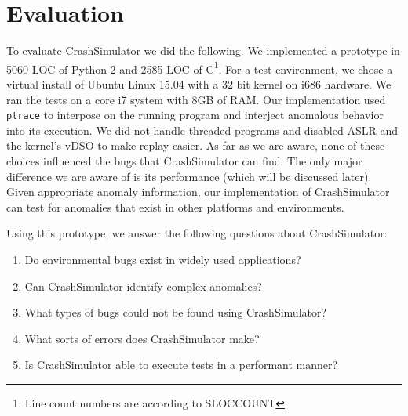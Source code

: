 \section{Evaluation}

To evaluate CrashSimulator we did the following.
We implemented a prototype in 5060 LOC of Python 2 and 2585 LOC of C\footnote{
Line count numbers are according to SLOCCOUNT}.  For a test
environment, we chose a virtual install of Ubuntu Linux 15.04 with a 32 bit kernel on i686 hardware.
We ran the tests on a core i7 system with 8GB of RAM. Our
implementation used {\tt ptrace} to interpose on the running program and
interject anomalous behavior into its execution.
We did not handle threaded programs and disabled ASLR and the kernel's vDSO to make replay
easier.  As far as we are aware, none of these choices influenced the bugs
that CrashSimulator can find.  The only major difference we are aware of 
is its performance (which will be discussed later).
Given appropriate anomaly information, our implementation of CrashSimulator can
test for anomalies that exist in other platforms and environments.  

Using this prototype, we answer the following questions about CrashSimulator:

\begin{enumerate}
   \item{Do environmental bugs exist in widely used applications?}
   \item{Can CrashSimulator identify complex anomalies?}
   \item{What types of bugs could not be found using CrashSimulator?}
   \item{What sorts of errors does CrashSimulator make?}
   \item{Is CrashSimulator able to execute tests in a performant manner?}
\end{enumerate}





